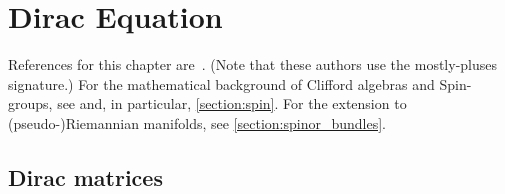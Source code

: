 \chapter{Dirac Equation}\label{chapter:dirac}

    References for this chapter are~\citet{van_proeyen_supergravity_2012}. (Note that these authors use the mostly-pluses signature.) For the mathematical background of Clifford algebras and Spin-groups, see  and, in particular, \cref{section:spin}. For the extension to (pseudo-)Riemannian manifolds, see \cref{section:spinor_bundles}.

    \minitoc

\section{Dirac matrices}

